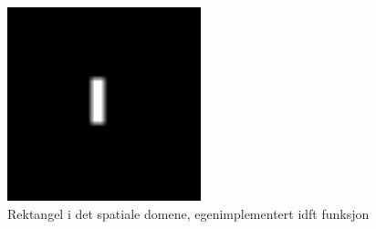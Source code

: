 \documentclass[a4paper, 12pt]{article}
\begin{document}
\begin{figure}[h]
  \centering
  \includegraphics[width=0.5\textwidth]{images/idft-rektangel}
  \caption{Rektangel i det spatiale domene, egenimplementert idft funksjon}
  \label{fig:idft}
\end{figure}
\end{document}

